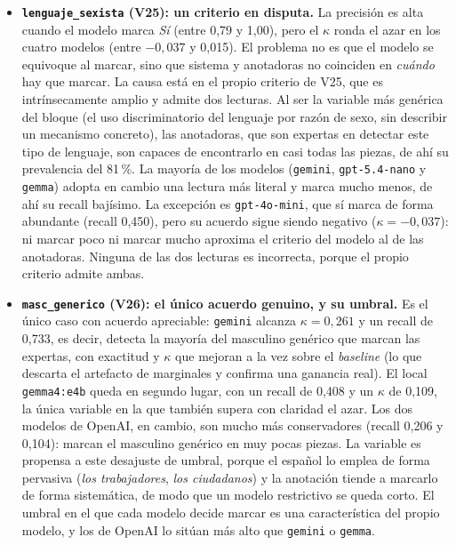 \begin{itemize}
    \item \textbf{\texttt{lenguaje\_sexista} (V25): un criterio en disputa.} La
    precisión es alta cuando el modelo marca \textit{Sí} (entre 0,79 y 1,00), pero el
    $\kappa$ ronda el azar en los cuatro modelos (entre $-0,037$ y 0,015). El problema
    no es que el modelo se equivoque al marcar, sino que sistema y anotadoras no
    coinciden en \emph{cuándo} hay que marcar. La causa está en el propio criterio de
    V25, que es intrínsecamente amplio y admite dos lecturas. Al ser la variable más
    genérica del bloque (el uso discriminatorio del lenguaje por razón de sexo, sin
    describir un mecanismo concreto), las anotadoras, que son expertas en detectar este tipo de lenguaje, son capaces de encontrarlo en casi todas las piezas, de ahí su prevalencia del
    81\,\%. La mayoría de los modelos (\texttt{gemini}, \texttt{gpt-5.4-nano} y
    \texttt{gemma}) adopta en cambio una lectura más literal y marca mucho menos, de
    ahí su recall bajísimo. La excepción es \texttt{gpt-4o-mini}, que sí marca de forma
    abundante (recall 0,450), pero su acuerdo sigue siendo negativo
    ($\kappa = -0,037$): ni marcar poco ni marcar mucho aproxima el criterio del modelo
    al de las anotadoras. Ninguna de las dos lecturas es incorrecta, porque el propio
    criterio admite ambas.

    \item \textbf{\texttt{masc\_generico} (V26): el único acuerdo genuino, y su
    umbral.} Es el único caso con acuerdo apreciable: \texttt{gemini} alcanza
    $\kappa = 0,261$ y un recall de 0,733, es decir, detecta la mayoría del masculino
    genérico que marcan las expertas, con exactitud y $\kappa$ que mejoran a la vez
    sobre el \textit{baseline} (lo que descarta el artefacto de marginales y confirma
    una ganancia real). El local \texttt{gemma4:e4b} queda en segundo lugar, con un
    recall de 0,408 y un $\kappa$ de 0,109, la única variable en la que también supera
    con claridad el azar. Los dos modelos de OpenAI, en cambio, son mucho más
    conservadores (recall 0,206 y 0,104): marcan el masculino genérico en muy pocas
    piezas. La variable es propensa a este desajuste de umbral, porque el español lo
    emplea de forma pervasiva (\textit{los trabajadores}, \textit{los ciudadanos}) y la
    anotación tiende a marcarlo de forma sistemática, de modo que un modelo restrictivo
    se queda corto. El umbral en el que cada modelo decide marcar es una característica
    del propio modelo, y los de OpenAI lo sitúan más alto que \texttt{gemini} o
    \texttt{gemma}.


\end{itemize}
